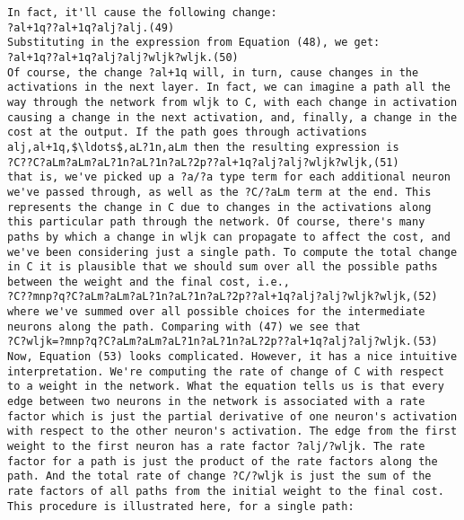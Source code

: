 \begin{lstlisting}
In fact, it'll cause the following change: 
?al+1q??al+1q?alj?alj.(49)
Substituting in the expression from Equation (48), we get: 
?al+1q??al+1q?alj?alj?wljk?wljk.(50)
Of course, the change ?al+1q will, in turn, cause changes in the activations in the next layer. In fact, we can imagine a path all the way through the network from wljk to C, with each change in activation causing a change in the next activation, and, finally, a change in the cost at the output. If the path goes through activations alj,al+1q,$\ldots$,aL?1n,aLm then the resulting expression is 
?C??C?aLm?aLm?aL?1n?aL?1n?aL?2p??al+1q?alj?alj?wljk?wljk,(51)
that is, we've picked up a ?a/?a type term for each additional neuron we've passed through, as well as the ?C/?aLm term at the end. This represents the change in C due to changes in the activations along this particular path through the network. Of course, there's many paths by which a change in wljk can propagate to affect the cost, and we've been considering just a single path. To compute the total change in C it is plausible that we should sum over all the possible paths between the weight and the final cost, i.e., 
?C??mnp?q?C?aLm?aLm?aL?1n?aL?1n?aL?2p??al+1q?alj?alj?wljk?wljk,(52)
where we've summed over all possible choices for the intermediate neurons along the path. Comparing with (47) we see that 
?C?wljk=?mnp?q?C?aLm?aLm?aL?1n?aL?1n?aL?2p??al+1q?alj?alj?wljk.(53)
Now, Equation (53) looks complicated. However, it has a nice intuitive interpretation. We're computing the rate of change of C with respect to a weight in the network. What the equation tells us is that every edge between two neurons in the network is associated with a rate factor which is just the partial derivative of one neuron's activation with respect to the other neuron's activation. The edge from the first weight to the first neuron has a rate factor ?alj/?wljk. The rate factor for a path is just the product of the rate factors along the path. And the total rate of change ?C/?wljk is just the sum of the rate factors of all paths from the initial weight to the final cost. This procedure is illustrated here, for a single path: 


\end{lstlisting}
